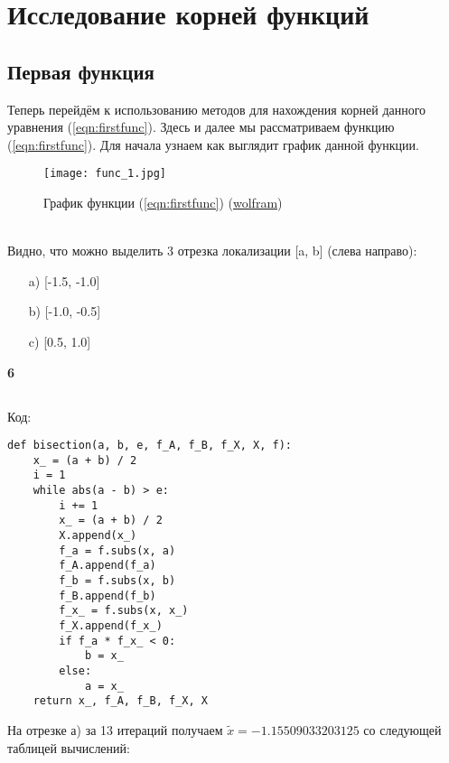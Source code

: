 \documentclass[a4paper,12pt]{article}
\begin{document}
\vspace{1.5cm}
\section{Исследование корней функций}
    \subsection{Первая функция}
    Теперь перейдём к использованию методов для нахождения корней данного уравнения (\ref{eqn:firstfunc}).
    Здесь и далее мы рассматриваем функцию (\ref{eqn:firstfunc}).
Для начала узнаем как выглядит график данной функции.
\begin{figure}[h]
    \centering
    \texttt{[image: func\_1.jpg]}
    \caption{График функции (\ref{eqn:firstfunc}) (\href{https://www.wolframalpha.com/}{\color{blue}wolfram})}
    \label{func1_graph}
\end{figure}\\
\vspace{0.5cm}
Видно, что можно выделить 3 отрезка локализации [a, b] (слева направо):
\begin{itemize}
    \item[a)] [-1.5, -1.0]
    \item[b)] [-1.0, -0.5]
    \item[c)] [0.5, 1.0]
\end{itemize}


\newpage
\begin{center}
{\bf6}\\
\vspace{0.5cm}
\end{center}
\setcounter{page}{6}
\subsection{}
Код:
\begin{lstlisting}
def bisection(a, b, e, f_A, f_B, f_X, X, f):
    x_ = (a + b) / 2
    i = 1
    while abs(a - b) > e:
        i += 1
        x_ = (a + b) / 2
        X.append(x_)
        f_a = f.subs(x, a)
        f_A.append(f_a)
        f_b = f.subs(x, b)
        f_B.append(f_b)
        f_x_ = f.subs(x, x_)
        f_X.append(f_x_)
        if f_a * f_x_ < 0:
            b = x_
        else:
            a = x_
    return x_, f_A, f_B, f_X, X
\end{lstlisting}

На отрезке а) за 13 итераций получаем $\tilde{x} = -1.15509033203125$ со следующей таблицей вычислений: \\
\end{document}
